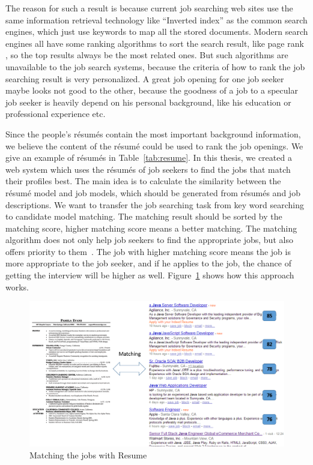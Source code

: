 The reason for such a result is because current job searching web sites use the same information retrieval technology like ``Inverted index'' \cite{zobel2006inverted} as the common search engines, which just use keywords to map all the stored documents. Modern search engines all have some ranking algorithms to sort the search result, like page rank \cite{page1999pagerank}, so the top results always be the most related ones. But such algorithms are unavailable to the job search systems, because the criteria  of how to rank the job searching result is very personalized. A great job opening for one job seeker maybe looks not good to the other, because the goodness of a job to a specular job seeker is heavily depend on his personal background, like his education or professional experience etc.

Since the people's r\'esum\'es contain the most important background information, we believe the content of the r\'esum\'e could be used to rank the job openings. We give an example of r\'esum\'es in Table~\ref{tab:resume}. In this thesis, we created a web system which uses the r\'esum\'es of job seekers to find the jobs that match their profiles best. The main idea is to calculate the similarity between the r\'esum\'e model and job models, which should be generated from r\'esum\'es and job descriptions. We want to transfer the job searching task from key word searching to candidate model matching. The matching result should be sorted by the matching score, higher matching score means a better matching. The matching algorithm does not only help job seekers to find the appropriate jobs, but also offers priority to them~\cite{gueutal2006brave}.  The job with higher matching score means the job is more appropriate to the job seeker, and if he applies to the job, the chance of getting the interview will be higher as well. Figure~\ref{fig:Matching} shows how this approach works.


\begin{figure}[htbp]
  \centering
  \includegraphics[scale=0.5]{images/matching.png}
  \caption{Matching the jobs with Resume}
  \label{fig:Matching}
\end{figure}


